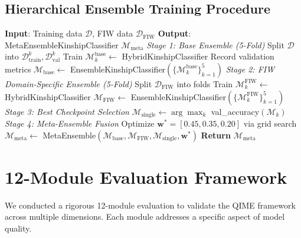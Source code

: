 \documentclass[journal,12pt]{IEEEtran}
\begin{document}
\subsection{Hierarchical Ensemble Training Procedure}
\begin{algorithm}[H]
    \caption{Hierarchical Meta-Ensemble Training}
    \begin{algorithmic}[1]
        \STATE \textbf{Input}: Training data $\mathcal{D}$, FIW data $\mathcal{D}_{\text{FIW}}$
        \STATE \textbf{Output}: MetaEnsembleKinshipClassifier $\mathcal{M}_{\text{meta}}$
        \STATE
        \STATE \textit{Stage 1: Base Ensemble (5-Fold)}
            \STATE Split $\mathcal{D}$ into $\mathcal{D}_{\text{train}}^k, \mathcal{D}_{\text{val}}^k$
            \STATE Train $\mathcal{M}_k^{\text{base}} \leftarrow$ HybridKinshipClassifier
            \STATE Record validation metrics
        \ENDFOR
        \STATE $\mathcal{M}_{\text{base}} \leftarrow$ EnsembleKinshipClassifier$(\{\mathcal{M}_k^{\text{base}}\}_{k=1}^5)$
        \STATE
        \STATE \textit{Stage 2: FIW Domain-Specific Ensemble (5-Fold)}
            \STATE Split $\mathcal{D}_{\text{FIW}}$ into folds
            \STATE Train $\mathcal{M}_k^{\text{FIW}} \leftarrow$ HybridKinshipClassifier
        \ENDFOR
        \STATE $\mathcal{M}_{\text{FIW}} \leftarrow$ EnsembleKinshipClassifier$(\{\mathcal{M}_k^{\text{FIW}}\}_{k=1}^5)$
        \STATE
        \STATE \textit{Stage 3: Best Checkpoint Selection}
        \STATE $\mathcal{M}_{\text{single}} \leftarrow \arg\max_k$ val\_accuracy$(\mathcal{M}_k)$
        \STATE
        \STATE \textit{Stage 4: Meta-Ensemble Fusion}
        \STATE Optimize $\mathbf{w}^* = [0.45, 0.35, 0.20]$ via grid search
        \STATE $\mathcal{M}_{\text{meta}} \leftarrow$ MetaEnsemble$(\mathcal{M}_{\text{base}}, \mathcal{M}_{\text{FIW}}, \mathcal{M}_{\text{single}}, \mathbf{w}^*)$
        \STATE \textbf{Return} $\mathcal{M}_{\text{meta}}$
    \end{algorithmic}
\end{algorithm}

\section{12-Module Evaluation Framework}
\label{sec:12_modules}

We conducted a rigorous 12-module evaluation to validate the QIME
framework across multiple dimensions. Each module addresses a specific
aspect of model quality.
\end{document}
